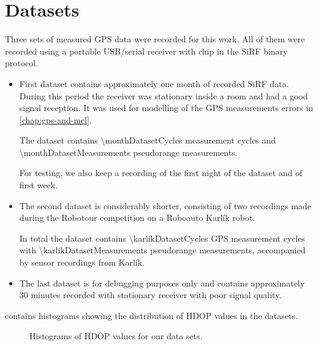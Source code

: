 \chapter{Datasets}
\label{chap:datasets}

Three sets of measured GPS data were recorded for this work.
All of them were recorded using a portable USB/serial receiver with \sirf chip
in the SiRF binary protocol.

\begin{itemize}

\item
First dataset contains approximately one month of recorded SiRF data.
During this period the receiver was stationary inside a room and had a good signal 
reception. 
It was used for modelling of the GPS measurements errors in \cref{chap:gps-and-mcl}.

The dataset contains \num{\monthDatasetCycles} measurement cycles and
\num{\monthDatasetMeasurements} pseudorange measurements.

For testing, we also keep a recording of the first night of the dataset and of first week.

\item
The second dataset is considerably shorter, consisting of two recordings made during
the Robotour competition \cite{robotour} on a Roboauto Karlík \cite{karlik} robot.

In total the dataset contains \num{\karlikDatasetCycles} GPS measurement cycles with
\num{\karlikDatasetMeasurements} pseudorange measurements, accompanied by sensor recordings from Karlík.

\item
The last dataset is for debugging purposes only and contains approximately
30 minutes recorded with stationary receiver with poor signal quality.

\end{itemize}

 contains histograms showing the distribution of HDOP values in the datasets.

\begin{figure}[htp]
	\centering
	\noindent{}
	\caption{Histograms of HDOP values for our data sets.}
	\label{fig:hdop-hist}
\end{figure}


